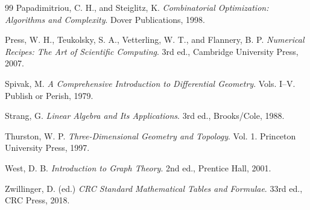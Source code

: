 \documentclass[11pt,fleqn]{book}
\numberwithin{equation}{chapter}
\theoremstyle{plain}
\theoremstyle{definition}
\theoremstyle{remark}
\begin{document}
\begin{thebibliography}{99}
Papadimitriou, C. H., and Steiglitz, K.
\emph{Combinatorial Optimization: Algorithms and Complexity}.
Dover Publications, 1998.

Press, W. H., Teukolsky, S. A., Vetterling, W. T., and Flannery, B. P.
\emph{Numerical Recipes: The Art of Scientific Computing}.
3rd ed., Cambridge University Press, 2007.

Spivak, M.
\emph{A Comprehensive Introduction to Differential Geometry}.
Vols. I--V.
Publish or Perish, 1979.

Strang, G.
\emph{Linear Algebra and Its Applications}.
3rd ed., Brooks/Cole, 1988.

Thurston, W. P.
\emph{Three-Dimensional Geometry and Topology}.
Vol. 1.
Princeton University Press, 1997.

West, D. B.
\emph{Introduction to Graph Theory}.
2nd ed., Prentice Hall, 2001.

Zwillinger, D. (ed.)
\emph{CRC Standard Mathematical Tables and Formulae}.
33rd ed., CRC Press, 2018.

\end{thebibliography}
\end{document}
